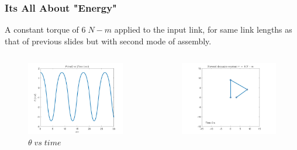 \documentclass[10pt,aspectratio=169]{beamer}
\begin{document}
\begin{frame}
\frametitle{Its All About "Energy"}
{\scriptsize A constant torque of $6\; N-m$ applied to the input link, for same link lengths as that of previous slides but with second mode of assembly.}
\begin{columns}
	\begin{column}{6cm}
		\begin{figure}
			\centering
			\includegraphics[width=6cm,keepaspectratio]{fourBarPendulum}
			\caption{$\theta \; vs \; time$}
		\end{figure}
	\end{column}
	\begin{column}{6cm}
		\begin{figure}
			\centering
			\href{run:./figure/fourBarPendulum.avi}{\includegraphics[width=6cm,keepaspectratio]{fourBarPendulumBanner}}
		\end{figure}
	\end{column}
\end{columns}
\end{frame}
\end{document}
